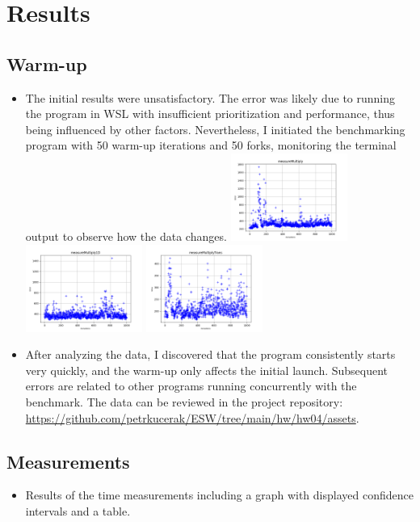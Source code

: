 \documentclass[onecolumn, conference]{IEEEtran}
\newcommand{\conciseItem}{\itemsep1pt \parskip0pt \parsep0pt}
\begin{document}
\section{Results}
\subsection{Warm-up}
\begin{itemize}
	\conciseItem
	\item The initial results were unsatisfactory. The error was likely due to running the program in WSL with insufficient prioritization and performance, thus being influenced by other factors. Nevertheless, I initiated the benchmarking program with 50 warm-up iterations and 50 forks, monitoring the terminal output to observe how the data changes.
	\includegraphics[width=0.3\textwidth]{warmup_measureMultiply.png}
	\includegraphics[width=0.3\textwidth]{warmup_measureMultiply1D.png}
	\includegraphics[width=0.3\textwidth]{warmup_measureMultiplyTrans.png}
	\item After analyzing the data, I discovered that the program consistently starts very quickly, and the warm-up only affects the initial launch. Subsequent errors are related to other programs running concurrently with the benchmark. The data can be reviewed in the project repository: \url{https://github.com/petrkucerak/ESW/tree/main/hw/hw04/assets}.
\end{itemize}
\subsection{Measurements}
\begin{itemize}
	\conciseItem
	\item Results of the time measurements including a graph with displayed confidence intervals and a table.
\end{itemize}
\end{document}
